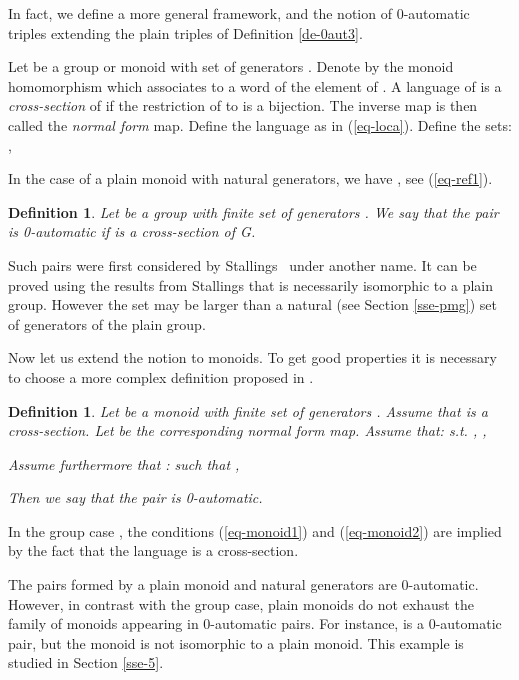 \documentclass[11pt,a4paper]{article}
\newtheorem{definition}[theorem]{Definition}
\theoremstyle{remark}
\def\eref#1{(\ref{#1})}
\begin{document}
In fact, we define a more general framework, and the notion of
0-automatic triples extending the plain triples of Definition
\ref{de-0aut3}. 

\medskip

Let  be a group or monoid with set of generators
. Denote by  the monoid
homomorphism which associates to a word  of
 the
element  of . A language  of
 is a {\em cross-section} of 
if the restriction of  to  is a bijection. The inverse map  is then called the {\em normal form} map.
Define the language  as in 
\eref{eq-loca}. Define the sets: ,

In the case of a plain monoid with natural generators, we have 
, see \eref{eq-ref1}. 

\begin{definition}\label{de-0autgroup}
Let  be a group with finite set of generators .
We say that the pair  is 0-\textrm{automatic} if
 is a cross-section of G.
\end{definition}

Such pairs were first considered by Stallings~\cite{stal} under
another name. It can be proved using the results from
Stallings that  is necessarily isomorphic to a plain group. 
However the set  may be larger than a natural (see Section \ref{sse-pmg})
set of generators of the plain group. 

\medskip

Now let us extend the notion to monoids. To get good properties it is
necessary to choose a more complex definition proposed in
\cite{mair04}. 

\begin{definition}\label{de-0autmonoid}
Let  be a monoid with finite set of generators .
Assume that  is
a cross-section. Let  be the
corresponding normal form map. Assume that:  s.t. 
, ,



Assume furthermore that :  such that ,

Then we say that the pair  is 0-automatic.
\end{definition}

In the group case , the conditions \eref{eq-monoid1} and
\eref{eq-monoid2} are implied by the fact that the language
 is a cross-section. 

\medskip

The pairs formed by a plain monoid and natural generators are
0-automatic. However, in contrast
with the group case, plain monoids do not exhaust the family
of monoids appearing in 0-automatic pairs. For instance, 
 is a 0-automatic pair, but the monoid 
is not isomorphic to a plain 
monoid. This example is studied in Section \ref{sse-5}. 
\end{document}
